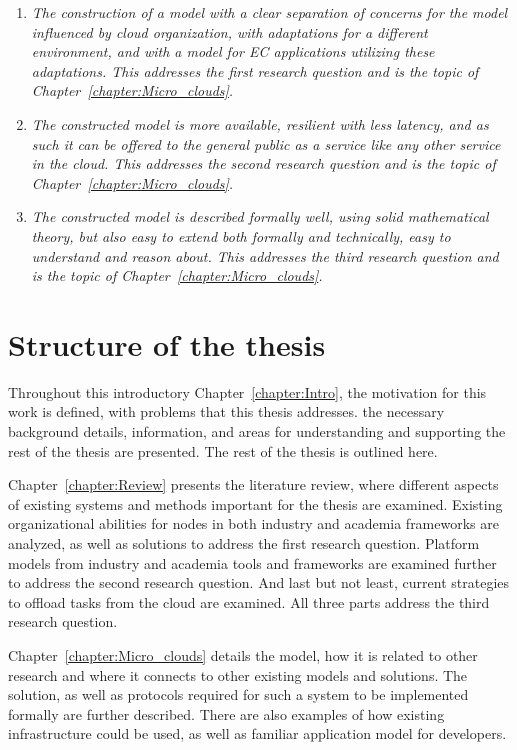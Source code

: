 \begin{enumerate}[start=1,label={(\bfseries \arabic*)}]
	\item \textit{The construction of a model with a clear separation of concerns for the model influenced by cloud organization, with adaptations for a different environment, and with a model for EC applications utilizing these adaptations. This addresses the first research question and is the topic of Chapter~\ref{chapter:Micro_clouds}.}
	\item \textit{The constructed model is more available, resilient with less latency, and as such it can be offered to the general public as a service like any other service in the cloud. This addresses the second research question and is the topic of Chapter~\ref{chapter:Micro_clouds}.}
	\item \textit{The constructed model is described formally well, using solid mathematical theory, but also easy to extend both formally and technically, easy to understand and reason about. This addresses the third research question and is the topic of Chapter~\ref{chapter:Micro_clouds}.}
\end{enumerate}
%
%
\section{Structure of the thesis}\label{sec:structure_of_thesis}
%
Throughout this introductory Chapter~\ref{chapter:Intro}, the motivation for this work is defined, with problems that this thesis addresses. the necessary background details, information, and areas for understanding and supporting the rest of the thesis are presented. The rest of the thesis is outlined here.

Chapter~\ref{chapter:Review} presents the literature review, where different aspects of existing systems and methods important for the thesis are examined. Existing organizational abilities for nodes in both industry and academia frameworks are analyzed, as well as solutions to address the first research question. Platform models from industry and academia tools and frameworks are examined further to address the second research question. And last but not least, current strategies to offload tasks from the cloud are examined. All three parts address the third research question.

Chapter~\ref{chapter:Micro_clouds} details the model, how it is related to other research and where it connects to other existing models and solutions. The solution, as well as protocols required for such a system to be implemented formally are further described. There are also examples of how existing infrastructure could be used, as well as familiar application model for developers. 


